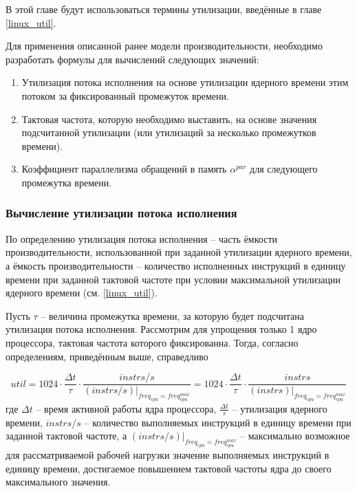     В этой главе будут использоваться термины утилизации, введённые в главе \ref{linux_util}.

    Для применения описанной ранее модели производительности, необходимо разработать формулы для
    вычислений следующих значений:
    \begin{enumerate}
        \item Утилизация потока исполнения на основе утилизации ядерного времени этим потоком за
        фиксированный промежуток времени.
        \item Тактовая частота, которую необходимо выставить, на основе значения подсчитанной
        утилизации (или утилизаций за несколько промежутков времени).
        \item Коэффициент параллелизма обращений в память $\alpha^{par}$ для следующего промежутка
        времени.
    \end{enumerate}

\subsubsection{Вычисление утилизации потока исполнения}

    По определению утилизация потока исполнения -- часть ёмкости производительности,
    использованной при заданной утилизации ядерного времени, а
    ёмкость производительности -- количество исполненных инструкций в единицу времени при заданной
    тактовой частоте при условии максимальной утилизации ядерного времени (см. \ref{linux_util}).

    Пусть $\tau$ -- величина промежутка времени, за которую будет подсчитана утилизация потока исполнения.
    Рассмотрим для упрощения только 1 ядро процессора, тактовая частота которого фиксированна.
    Тогда, согласно определениям, приведённым выше, справедливо

    \begin{equation}
        util = 1024 \cdot \frac{\Delta t}{\tau} \cdot \frac{instrs / s}{(instrs / s) |_{freq_{cpu} = freq_{cpu}^{max}}} =
            1024 \cdot \frac{\Delta t}{\tau} \cdot \frac{instrs}{(instrs) |_{freq_{cpu} = freq_{cpu}^{max}}}
    \end{equation}
    где $\Delta t$ -- время активной работы ядра процессора, $\frac{\Delta t}{\tau}$ -- утилизация ядерного
    времени, $instrs / s$ -- количество выполняемых инструкций в единицу времени при заданной тактовой
    частоте, а $(instrs / s) |_{freq_{cpu} = freq_{cpu}^{max}}$ -- максимально возможное для
    рассматриваемой рабочей нагрузки значение выполняемых инструкций в единицу времени, достигаемое
    повышением тактовой частоты ядра до своего максимального значения.

